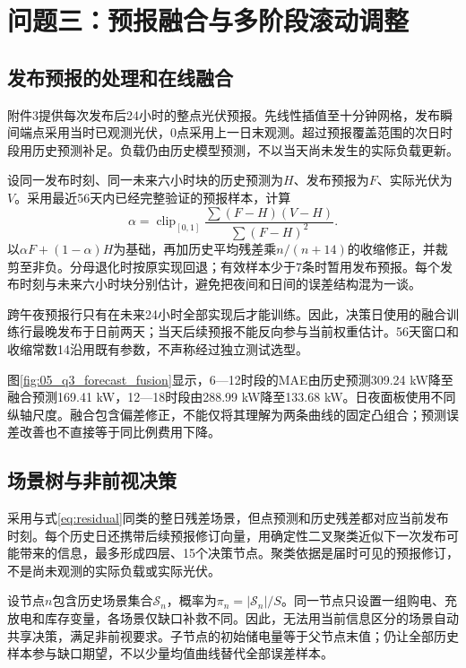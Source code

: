 \section{问题三：预报融合与多阶段滚动调整}
\subsection{发布预报的处理和在线融合}
附件3提供每次发布后24小时的整点光伏预报。先线性插值至十分钟网格，发布瞬间端点采用当时已观测光伏，0点采用上一日末观测。超过预报覆盖范围的次日时段用历史预测补足。负载仍由历史模型预测，不以当天尚未发生的实际负载更新。

设同一发布时刻、同一未来六小时块的历史预测为$H$、发布预报为$F$、实际光伏为$V$。采用最近56天内已经完整验证的预报样本，计算
\begin{equation}
\alpha=\operatorname{clip}_{[0,1]}
\frac{\sum(F-H)(V-H)}{\sum(F-H)^2}.\label{eq:fusion}
\end{equation}
以$\alpha F+(1-\alpha)H$为基础，再加历史平均残差乘$n/(n+14)$的收缩修正，并裁剪至非负。分母退化时按原实现回退；有效样本少于7条时暂用发布预报。每个发布时刻与未来六小时块分别估计，避免把夜间和日间的误差结构混为一谈。

跨午夜预报行只有在未来24小时全部实现后才能训练。因此，决策日使用的融合训练行最晚发布于日前两天；当天后续预报不能反向参与当前权重估计。56天窗口和收缩常数14沿用既有参数，不声称经过独立测试选型。

图\ref{fig:05_q3_forecast_fusion}显示，6—12时段的MAE由历史预测309.24 kW降至融合预测169.41 kW，12—18时段由288.99 kW降至133.68 kW。日夜面板使用不同纵轴尺度。融合包含偏差修正，不能仅将其理解为两条曲线的固定凸组合；预测误差改善也不直接等于同比例费用下降。

\subsection{场景树与非前视决策}
采用与式\eqref{eq:residual}同类的整日残差场景，但点预测和历史残差都对应当前发布时刻。每个历史日还携带后续预报修订向量，用确定性二叉聚类近似下一次发布可能带来的信息，最多形成四层、15个决策节点。聚类依据是届时可见的预报修订，不是尚未观测的实际负载或实际光伏。

设节点$n$包含历史场景集合$\mathcal S_n$，概率为$\pi_n=|\mathcal S_n|/S$。同一节点只设置一组购电、充放电和库存变量，各场景仅缺口补救不同。因此，无法用当前信息区分的场景自动共享决策，满足非前视要求。子节点的初始储电量等于父节点末值；仍让全部历史样本参与缺口期望，不以少量均值曲线替代全部误差样本。

